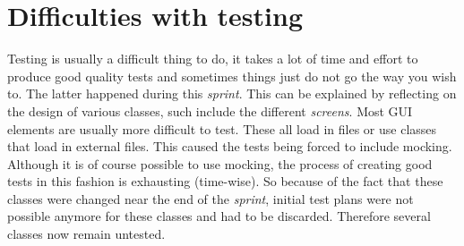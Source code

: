\documentclass[a4paper,11pt]{article}
\begin{document}
\section*{Difficulties with testing}
Testing is usually a difficult thing to do, it takes a lot of time and effort to produce good quality tests and sometimes things just do not go the way you wish to. The latter happened during this \textit{sprint}. This can be explained by reflecting on the design of various classes, such include the different \textit{screens}. Most GUI elements are usually more difficult to test. These all load in files or use classes that load in external files. This caused the tests being forced to include mocking. Although it is of course possible to use mocking, the process of creating good tests in this fashion is exhausting (time-wise). So because of the fact that these classes were changed near the end of the \textit{sprint}, initial test plans were not possible anymore for these classes and had to be discarded. Therefore several classes now remain untested.
\end{document}
